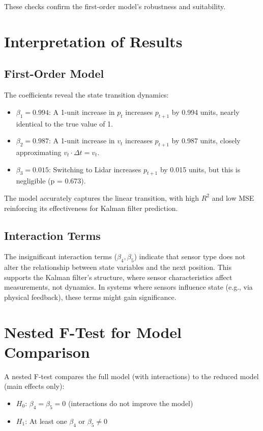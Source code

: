 \documentclass[12pt]{article}
\begin{document}
These checks confirm the first-order model’s robustness and suitability.

\section{Interpretation of Results}
\label{sec:interpretation}

\subsection{First-Order Model}
The coefficients reveal the state transition dynamics:
\begin{itemize}
    \item \( \beta_1 = 0.994 \): A 1-unit increase in \( p_t \) increases \( p_{t+1} \) by 0.994 units, nearly identical to the true value of 1.
    \item \( \beta_2 = 0.987 \): A 1-unit increase in \( v_t \) increases \( p_{t+1} \) by 0.987 units, closely approximating \( v_t \cdot \Delta t = v_t \).
    \item \( \beta_3 = 0.015 \): Switching to Lidar increases \( p_{t+1} \) by 0.015 units, but this is negligible (p = 0.673).
\end{itemize}

The model accurately captures the linear transition, with high \( R^2 \) and low MSE reinforcing its effectiveness for Kalman filter prediction.

\subsection{Interaction Terms}
The insignificant interaction terms (\( \beta_4, \beta_5 \)) indicate that sensor type does not alter the relationship between state variables and the next position. This supports the Kalman filter’s structure, where sensor characteristics affect measurements, not dynamics. In systems where sensors influence state (e.g., via physical feedback), these terms might gain significance.

\section{Nested F-Test for Model Comparison}
\label{sec:nested-f-test}

A nested F-test compares the full model (with interactions) to the reduced model (main effects only):
\begin{itemize}
    \item \textbf{\( H_0 \)}: \( \beta_4 = \beta_5 = 0 \) (interactions do not improve the model)
    \item \textbf{\( H_1 \)}: At least one \( \beta_4 \) or \( \beta_5 \neq 0 \)
\end{itemize}
\end{document}
